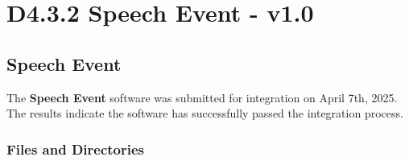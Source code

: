 \documentclass{CSSRforAfrica}
\begin{document}

\section{D4.3.2 Speech Event - v1.0} 
\subsection{Speech Event} 
\label{subsection:speech_event}
The \textbf{Speech Event} software was submitted for integration on April 7th, 2025. The results indicate the software has successfully passed the integration process. 

\subsubsection{Files and Directories}
 
\end{document}

